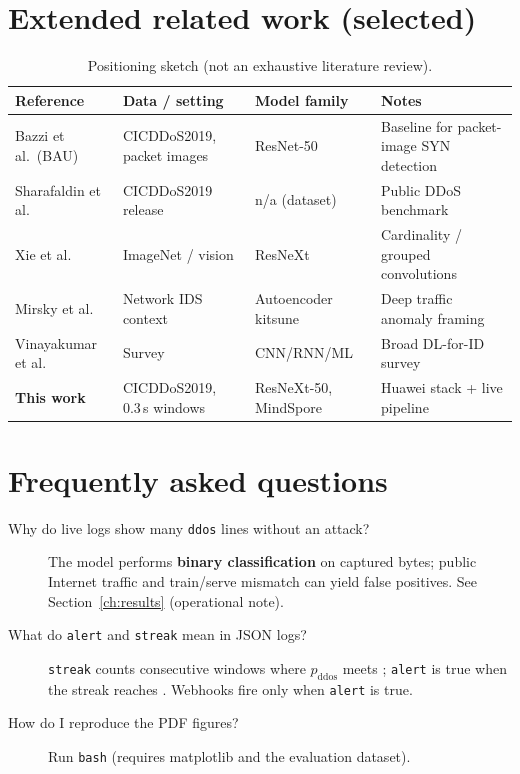 \section{Extended related work (selected)}
\begin{table}[ht]
\centering
\small
\begin{tabular}{|>{\raggedright\arraybackslash}p{2.6cm}|>{\raggedright\arraybackslash}p{3.0cm}|>{\raggedright\arraybackslash}p{3.0cm}|>{\raggedright\arraybackslash}p{3.6cm}|}
\hline
\textbf{Reference} & \textbf{Data / setting} & \textbf{Model family} & \textbf{Notes} \\
\hline
Bazzi et al.\ (BAU)~\cite{bazzi2022resnet} & CICDDoS2019, packet images & ResNet-50 & Baseline for packet-image SYN detection \\
\hline
Sharafaldin et al.~\cite{cic2019ddos} & CICDDoS2019 release & n/a (dataset) & Public DDoS benchmark \\
\hline
Xie et al.~\cite{xie2017aggregated} & ImageNet / vision & ResNeXt & Cardinality / grouped convolutions \\
\hline
Mirsky et al.~\cite{mirsky2019kitsune} & Network IDS context & Autoencoder kitsune & Deep traffic anomaly framing \\
\hline
Vinayakumar et al.~\cite{vinayakumar2019review} & Survey & CNN/RNN/ML & Broad DL-for-ID survey \\
\hline
\textbf{This work} & CICDDoS2019, 0.3\,s windows & ResNeXt-50, MindSpore & Huawei stack + live pipeline \\
\hline
\end{tabular}
\caption[Extended related-work positioning]{Positioning sketch (not an exhaustive literature review).}
\label{tab:extendedlit}
\end{table}

\section{Frequently asked questions}
\begin{description}
  \item[Why do live logs show many \texttt{ddos} lines without an attack?]
    The model performs \textbf{binary classification} on captured bytes; public
    Internet traffic and train/serve mismatch can yield false positives. See
    Section~\ref{ch:results} (operational note).
  \item[What do \texttt{alert} and \texttt{streak} mean in JSON logs?]
    \texttt{streak} counts consecutive windows where $p_{\mathrm{ddos}}$ meets
    ; \texttt{alert} is true when the streak reaches
    . Webhooks fire only when \texttt{alert} is true.
  \item[How do I reproduce the PDF figures?] Run
    \texttt{bash}  (requires matplotlib and the
    evaluation dataset).
\end{description}

